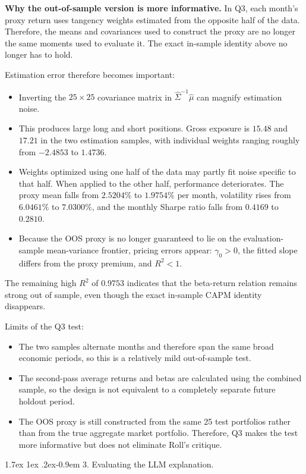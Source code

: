 \documentclass[11pt]{article}
\makeatletter
\renewcommand\paragraph{\@startsection{paragraph}{4}{0pt}%
  {1.7ex \@plus 1ex \@minus .2ex}{-0.9em}%
  {\normalfont\bfseries\normalsize\color{psink}}}
\newenvironment{tight}
  {\begin{itemize}\setlength{\itemsep}{3pt}\setlength{\parskip}{0pt}%
   \setlength{\topsep}{3pt}\setlength{\leftmargini}{1.4em}}
  {\end{itemize}}
\makeatother
\begin{document}
\textbf{Why the out-of-sample version is more informative.} In Q3, each month's
proxy return uses tangency weights estimated from the opposite half of the
data. Therefore, the means and covariances used to construct the proxy are no
longer the same moments used to evaluate it. The exact in-sample identity above
no longer has to hold.

Estimation error therefore becomes important:
\begin{tight}
\item Inverting the $25\times25$ covariance matrix in
$\hat\Sigma^{-1}\hat\mu$
can magnify estimation noise.
\item This produces large long and short positions. Gross exposure is $15.48$
and $17.21$ in the two estimation samples, with individual weights ranging
roughly from $-2.4853$ to $1.4736$.
\item Weights optimized using one half of the data may partly fit noise
specific to that half. When applied to the other half, performance
deteriorates. The proxy mean falls from $2.5204\%$ to $1.9754\%$ per month,
volatility rises from $6.0461\%$ to $7.0300\%$, and the monthly Sharpe ratio
falls from $0.4169$ to $0.2810$.
\item Because the OOS proxy is no longer guaranteed to lie on the
evaluation-sample mean-variance frontier, pricing errors appear:
$\gamma_0 > 0$, the fitted slope differs from the proxy premium, and
$R^2 < 1$.
\end{tight}

The remaining high $R^2$ of $0.9753$ indicates that the beta-return relation
remains strong out of sample, even though the exact in-sample CAPM identity
disappears.

Limits of the Q3 test:
\begin{tight}
\item The two samples alternate months and therefore span the same broad
economic periods, so this is a relatively mild out-of-sample test.
\item The second-pass average returns and betas are calculated using the
combined sample, so the design is not equivalent to a completely separate
future holdout period.
\item The OOS proxy is still constructed from the same 25 test portfolios
rather than from the true aggregate market portfolio. Therefore, Q3 makes the
test more informative but does not eliminate Roll's critique.
\end{tight}

\paragraph{3. Evaluating the LLM explanation.}
\end{document}

